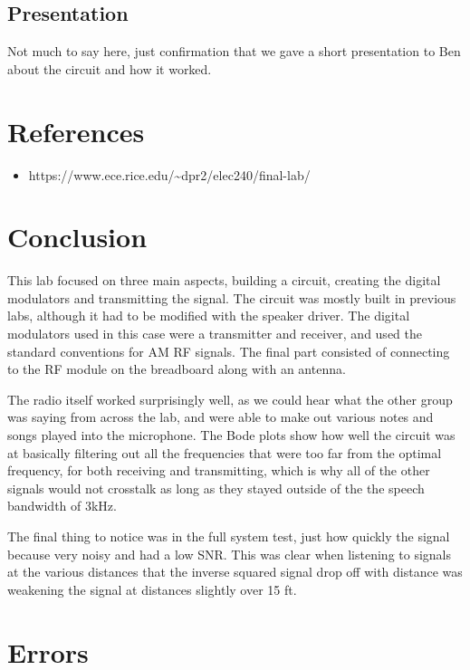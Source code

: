 \documentclass[10pt]{article}
\begin{document}
\medskip

\subsection{Presentation}
Not much to say here, just confirmation that we gave a short presentation to Ben about the circuit and how it worked. 

\section{References}


\medskip

\begin{itemize}
	\item https://www.ece.rice.edu/\~{}dpr2/elec240/final-lab/
\end{itemize}
\section{Conclusion}

This lab focused on three main aspects, building a circuit, creating the digital modulators and transmitting the signal. The circuit was mostly built in previous labs, although it had to be modified with the speaker driver. The digital modulators used in this case were a transmitter and receiver, and used the standard conventions for AM RF signals. The final part consisted of connecting to the RF module on the breadboard along with an antenna.

The radio itself worked surprisingly well, as we could hear what the other group was saying from across the lab, and were able to make out various notes and songs played into the microphone. The Bode plots show how well the circuit was at basically filtering out all the frequencies that were too far from the optimal frequency, for both receiving and transmitting, which is why all of the other signals would not crosstalk as long as they stayed outside of the the speech bandwidth of 3kHz. 

The final thing to notice was in the full system test, just how quickly the signal because very noisy and had a low SNR. This was clear when listening to signals at the various distances that the inverse squared signal drop off with distance was weakening the signal at distances slightly over 15 ft. 

\medskip

\section{Errors}
\end{document}
